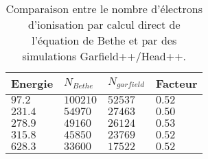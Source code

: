 \begin{table}[ht]%
	\centering
	\caption[]
	{Comparaison entre le nombre d'électrons d'ionisation par calcul direct de l'équation de Bethe et par des simulations Garfield++/Head++.}
	\label{sumfr:table:GarfieldBethe}
	\begin{tabularx}{\linewidth}{XXXX}
		\toprule
		Energie    & \(N_{Bethe}\) & \(N_{garfield}\) & Facteur \\
		\midrule
		\(97.2\)  & \(100210\)    & \(52537\)             & \(0.52\)   \\
		\(231.4\) & \(54970\)     & \(27463\)             & \(0.50\)   \\
		\(278.9\) & \(49160\)     & \(26124\)             & \(0.53\)   \\
		\(315.8\) & \(45850\)     & \(23769\)             & \(0.52\)   \\
		\(628.3\) & \(33600\)     & \(17522\)             & \(0.52\)   \\
		\bottomrule
	\end{tabularx}
\end{table}